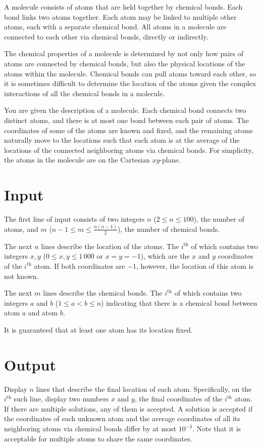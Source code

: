 
A molecule consists of atoms that are held together by chemical bonds.
Each bond links two atoms
together.  Each atom may be linked to multiple other atoms, each with
a separate chemical bond.  All atoms in a molecule are connected to
each other via chemical bonds, directly or indirectly.

The chemical properties of a molecule is determined by not only how
pairs of atoms are connected by chemical bonds, but also the physical
locations of the atoms within the molecule.  Chemical bonds can pull
atoms toward each other, so it is sometimes difficult to determine the
location of the atoms given the complex interactions of all the
chemical bonds in a molecule.

You are given the description of a molecule. Each chemical bond connects
two distinct atoms, and there is at most one bond between each pair of atoms.
The coordinates of some of the atoms are known and fixed, and the remaining atoms
naturally move to the locations such that each atom is at the average
of the locations of the connected neighboring atoms via chemical bonds.  For
simplicity, the atoms in the molecule are on the Cartesian $xy$-plane.

\section*{Input}

The first line of input consists of two integers $n$ ($2 \leq n \leq 100$),
the number of atoms, and $m$ ($n-1 \leq m \leq \frac{n(n-1)}{2}$),
the number of chemical bonds.

The next $n$ lines describe the location of the atoms. The $i^\textrm{th}$ of which contains
two integers $x, y$ ($0 \leq x,y \leq 1\,000$ or $x = y = -1$), which are the $x$ and $y$
coordinates of the $i^\textrm{th}$ atom.  If both coordinates are $-1$, however, the location
of this atom is not known.

The next $m$ lines describe the chemical bonds. The $i^\textrm{th}$ of which contains two
integers $a$ and $b$ ($1 \leq a < b \leq n$) indicating that
there is a chemical bond between atom $a$ and atom $b$.

It is guaranteed that at least one atom has its location fixed.

\section*{Output}

Display $n$ lines that describe the final location of each atom.
Specifically, on the $i^\textrm{th}$ such line, display two numbers
$x$ and $y$, the final coordinates of the $i^\textrm{th}$ atom. If
there are multiple solutions, any of them is accepted. A solution is
accepted if the coordinates of each unknown atom and the average
coordinates of all its neighboring atoms via chemical bonds differ by
at most $10^{-3}$.  Note that it is acceptable for multiple atoms to
share the same coordinates.
